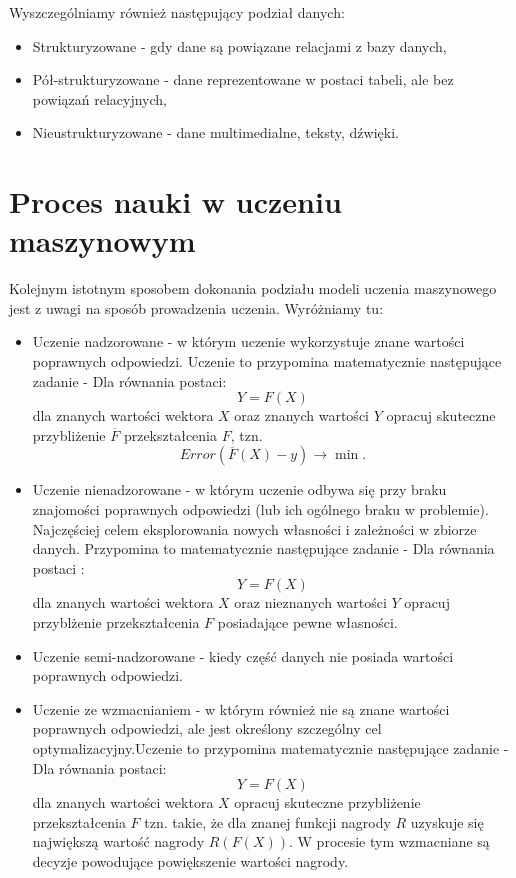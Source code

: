 \documentclass[10pt,a4paper]{book}
\begin{document}
Wyszczególniamy również następujący podział danych:
\begin{itemize}
\item Strukturyzowane - gdy dane są powiązane relacjami z bazy danych,
\item Pół-strukturyzowane - dane reprezentowane w postaci tabeli, ale bez powiązań relacyjnych,
\item Nieustrukturyzowane - dane multimedialne, teksty, dźwięki.
\end{itemize}

\section{Proces nauki w uczeniu maszynowym}

Kolejnym istotnym sposobem dokonania podziału modeli uczenia maszynowego jest z uwagi na sposób prowadzenia uczenia. Wyróżniamy tu:

\begin{itemize}
\item Uczenie nadzorowane - w którym uczenie wykorzystuje znane wartości poprawnych odpowiedzi. Uczenie to przypomina matematycznie następujące zadanie - Dla równania postaci:
$$
Y= F(X)
$$
dla znanych wartości wektora $X$ oraz znanych wartości $Y$ opracuj skuteczne przybliżenie $\overline{F}$ przekształcenia $F$, tzn.
$$
Error(\overline{F}(X) - y) \to \min.
$$
\item Uczenie nienadzorowane - w którym uczenie odbywa się przy braku znajomości poprawnych odpowiedzi (lub ich ogólnego braku w problemie). Najczęściej celem eksplorowania nowych własności i zależności w zbiorze danych. Przypomina to matematycznie następujące zadanie - Dla równania postaci :
$$
Y = F(X)
$$
dla znanych wartości wektora $X$ oraz nieznanych wartości $Y$ opracuj przyblżenie przekształcenia $F$ posiadające pewne własności.
\item Uczenie semi-nadzorowane - kiedy część danych nie posiada wartości poprawnych odpowiedzi.
\item Uczenie ze wzmacnianiem - w którym również nie są znane wartości poprawnych odpowiedzi, ale jest określony szczególny cel optymalizacyjny.Uczenie to przypomina matematycznie następujące zadanie - Dla równania postaci:
$$
Y = F(X)
$$
dla znanych wartości wektora $X$ opracuj skuteczne przybliżenie przekształcenia $F$ tzn. takie, że dla znanej funkcji nagrody $R$ uzyskuje się największą wartość nagrody $R(F(X))$. W procesie tym wzmacniane są decyzje powodujące powiększenie wartości nagrody.
\end{itemize}
\end{document}

